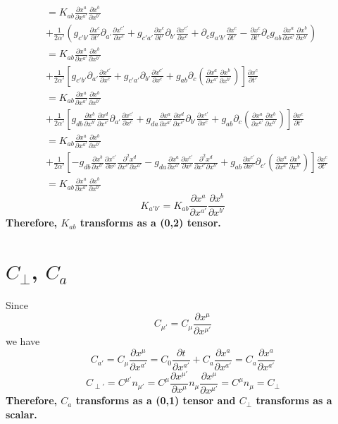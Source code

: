 \documentclass{article}
\begin{document}
\begin{align*}
& = K_{ab}\frac{\partial x^{a}}{\partial x^{a'}}\frac{\partial x^{b}}{\partial x^{b'}}\\
& + \frac{1}{2\alpha'}(g_{c'b'}\frac{\partial x^{c}}{\partial t'}\partial_{a'}\frac{\partial x^{c'}}{\partial x^{c}} + g_{c'a'}\frac{\partial x^{c}}{\partial t'}\partial_{b'}\frac{\partial x^{c'}}{\partial x^{c}} + \partial_{c}g_{a'b'}\frac{\partial x^{c}}{\partial t'} - \frac{\partial x^{c}}{\partial t'}\partial_{c}g_{ab}\frac{\partial x^{a}}{\partial x^{a'}}\frac{\partial x^{b}}{\partial x^{b'}})\\
& = K_{ab}\frac{\partial x^{a}}{\partial x^{a'}}\frac{\partial x^{b}}{\partial x^{b'}}\\
& + \frac{1}{2\alpha'}[g_{c'b'}\partial_{a'}\frac{\partial x^{c'}}{\partial x^{c}} + g_{c'a'}\partial_{b'}\frac{\partial x^{c'}}{\partial x^{c}} + g_{ab}\partial_{c}(\frac{\partial x^{a}}{\partial x^{a'}}\frac{\partial x^{b}}{\partial x^{b'}})]\frac{\partial x^{c}}{\partial t'}\\
& = K_{ab}\frac{\partial x^{a}}{\partial x^{a'}}\frac{\partial x^{b}}{\partial x^{b'}}\\
& + \frac{1}{2\alpha'}[g_{db}\frac{\partial x^{b}}{\partial x^{b'}}\frac{\partial x^{d}}{\partial x^{c'}}\partial_{a'}\frac{\partial x^{c'}}{\partial x^{c}} + g_{da}\frac{\partial x^{a}}{\partial x^{a'}}\frac{\partial x^{d}}{\partial x^{c'}}\partial_{b'}\frac{\partial x^{c'}}{\partial x^{c}}  + g_{ab}\partial_{c}(\frac{\partial x^{a}}{\partial x^{a'}}\frac{\partial x^{b}}{\partial x^{b'}})]\frac{\partial x^{c}}{\partial t'}\\
& = K_{ab}\frac{\partial x^{a}}{\partial x^{a'}}\frac{\partial x^{b}}{\partial x^{b'}}\\
& + \frac{1}{2\alpha'}[-g_{db}\frac{\partial x^{b}}{\partial x^{b'}}\frac{\partial x^{c'}}{\partial x^{c}}\frac{\partial^2 x^{d}}{\partial x^{c'}\partial x^{a'}} - g_{da}\frac{\partial x^{a}}{\partial x^{a'}}\frac{\partial x^{c'}}{\partial x^{c}}\frac{\partial^2 x^{d}}{\partial x^{c'}\partial x^{b'}} + g_{ab}\frac{\partial x^{c'}}{\partial x^{c}}\partial_{c'}(\frac{\partial x^{a}}{\partial x^{a'}}\frac{\partial x^{b}}{\partial x^{b'}})]\frac{\partial x^{c}}{\partial t'}\\
& = K_{ab}\frac{\partial x^{a}}{\partial x^{a'}}\frac{\partial x^{b}}{\partial x^{b'}}
\end{align*}
\[
\boxed{
K_{a'b'} = K_{ab}\frac{\partial x^{a}}{\partial x^{a'}}\frac{\partial x^{b}}{\partial x^{b'}}
}
\]
{\bf {\color{red}Therefore, $K_{ab}$ transforms as a (0,2) tensor.}}
\section{$C_{\perp}$, $C_{a}$}
Since
\[
C_{\mu'} = C_{\mu}\frac{\partial x^{\mu}}{\partial x^{\mu'}}
\]
we have
\[
\boxed{
C_{a'} = C_{\mu}\frac{\partial x^{\mu}}{\partial x^{a'}} = C_{0}\frac{\partial t}{\partial x^{a'}} + C_{a}\frac{\partial x^{a}}{\partial x^{a'}} = C_{a}\frac{\partial x^{a}}{\partial x^{a'}}
}
\]
\[
\boxed{
C_{\perp'} = C^{\mu'}n_{\mu'} = C^{\mu}\frac{\partial x^{\mu'}}{\partial x^{\mu}}n_{\mu}\frac{\partial x^{\mu}}{\partial x^{\mu'}} = C^{\mu}n_{\mu} = C_{\perp}
}
\]
{\bf {\color{red}Therefore, $C_{a}$ transforms as a (0,1) tensor and $C_{\perp}$ transforms as a scalar.}}
\end{document}

